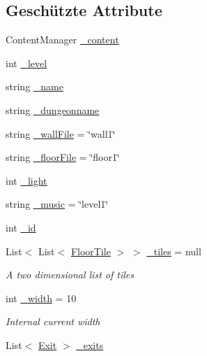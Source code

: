 \subsection*{Geschützte Attribute}
\begin{DoxyCompactItemize}
\item 
Content\-Manager \hyperlink{class_gruppe22_1_1_backend_1_1_map_a477dd82902079fe3e40bedf22dbf2055}{\-\_\-content}
\item 
int \hyperlink{class_gruppe22_1_1_backend_1_1_map_a90048a67b858c4e4e5e3937785a59c83}{\-\_\-level}
\item 
string \hyperlink{class_gruppe22_1_1_backend_1_1_map_a4848f9eaed6a4fb65f88bd3b72e2d8f0}{\-\_\-name}
\item 
string \hyperlink{class_gruppe22_1_1_backend_1_1_map_a6c2e2b3369e1d2f793ae1c09d625a8ad}{\-\_\-dungeonname}
\item 
string \hyperlink{class_gruppe22_1_1_backend_1_1_map_aa963f4d1f06aa5722e961a7674828910}{\-\_\-wall\-File} = \char`\"{}wall1\char`\"{}
\item 
string \hyperlink{class_gruppe22_1_1_backend_1_1_map_a244299d80c512876e41c641aafa5effc}{\-\_\-floor\-File} = \char`\"{}floor1\char`\"{}
\item 
int \hyperlink{class_gruppe22_1_1_backend_1_1_map_ad75386d3edea7cb43bbf558742a5824e}{\-\_\-light}
\item 
string \hyperlink{class_gruppe22_1_1_backend_1_1_map_a99cac5327d78e72ced96f0dad20060cf}{\-\_\-music} = \char`\"{}level1\char`\"{}
\item 
int \hyperlink{class_gruppe22_1_1_backend_1_1_map_a09dec3f5d4010c7f0f3578e5de84d01b}{\-\_\-id}
\item 
List$<$ List$<$ \hyperlink{class_gruppe22_1_1_backend_1_1_floor_tile}{Floor\-Tile} $>$ $>$ \hyperlink{class_gruppe22_1_1_backend_1_1_map_a50c1a30d7d1c705375416767a474aa36}{\-\_\-tiles} = null
\begin{DoxyCompactList}\small\item\em A two dimensional list of tiles \end{DoxyCompactList}\item 
int \hyperlink{class_gruppe22_1_1_backend_1_1_map_a18b255b6ba29200aa83cd246ae8e3427}{\-\_\-width} = 10
\begin{DoxyCompactList}\small\item\em Internal current width \end{DoxyCompactList}\item 
List$<$ \hyperlink{class_gruppe22_1_1_backend_1_1_exit}{Exit} $>$ \hyperlink{class_gruppe22_1_1_backend_1_1_map_a57a44f95cc20e9516fb6d0ae805b68df}{\-\_\-exits}

\end{DoxyCompactItemize}
